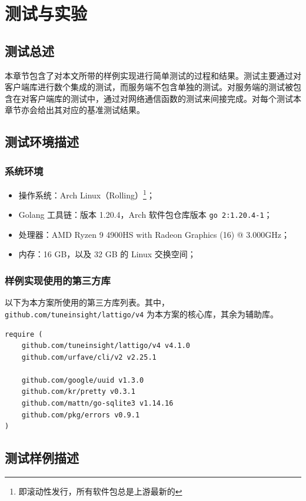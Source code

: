 \chapter{测试与实验}

\section{测试总述}
本章节包含了对本文所带的样例实现进行简单测试的过程和结果。测试主要通过对客户端库进行数个集成的测试，而服务端不包含单独的测试。对服务端的测试被包含在对客户端库的测试中，通过对网络通信函数的测试来间接完成。对每个测试本章节亦会给出其对应的基准测试结果。

\section{测试环境描述}

\subsection{系统环境}

\begin{itemize}
    \item 操作系统：Arch Linux（Rolling）\footnote{即滚动性发行，所有软件包总是上游最新的}；
    \item Golang 工具链：版本 1.20.4，Arch 软件包仓库版本 \verb|go 2:1.20.4-1|；
    \item 处理器：AMD Ryzen 9 4900HS with Radeon Graphics (16) @ 3.000GHz；
    \item 内存：16 GB，以及 32 GB 的 Linux 交换空间；
\end{itemize}

\subsection{样例实现使用的第三方库}

以下为本方案所使用的第三方库列表。其中，\verb|github.com/tuneinsight/lattigo/v4| 为本方案的核心库，其余为辅助库。

\begin{verbatim}
require (
    github.com/tuneinsight/lattigo/v4 v4.1.0
    github.com/urfave/cli/v2 v2.25.1

    github.com/google/uuid v1.3.0
    github.com/kr/pretty v0.3.1
    github.com/mattn/go-sqlite3 v1.14.16
    github.com/pkg/errors v0.9.1
)
\end{verbatim}

\section{测试样例描述}

